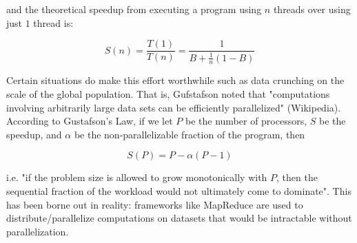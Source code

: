 \documentclass[twoside]{article}
\begin{document}
and the theoretical speedup from executing a program using $n$ threads over using just $1$ thread is:

$$S(n) = \frac{T(1)}{T(n)} = \frac{1}{B + \frac{1}{n}(1 - B)}$$

Certain situations do make this effort worthwhile such as data crunching on the scale of the global population. That is, Gufstafson noted that "computations involving arbitrarily large data sets can be efficiently parallelized" (Wikipedia). According to Gustafson's Law, if we let $P$ be the number of processors, $S$ be the speedup, and $\alpha$ be the non-parallelizable fraction of the program, then

$$S(P) = P - \alpha (P-1)$$

i.e. "if the problem size is allowed to grow monotonically with $P$, then the sequential fraction of the workload would not ultimately come to dominate". This has been borne out in reality: frameworks like MapReduce are used to distribute/parallelize computations on datasets that would be intractable without parallelization.
\end{document}
